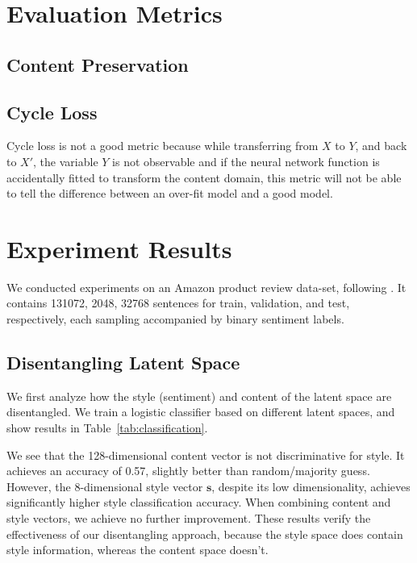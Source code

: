 \section{Evaluation Metrics}

\subsection{Content Preservation} \label{content-preservation-metric}

\subsection{Cycle Loss}

Cycle loss is not a good metric because while transferring from $X$ to $Y$, and back to $X'$, the variable $Y$ is not observable and if the neural network function is accidentally fitted to transform the content domain, this metric will not be able to tell the difference between an over-fit model and a good model.


\section{Experiment Results}

We conducted experiments on an Amazon product review data-set, following \cite{fu2017style}. It contains 131072, 2048, 32768 sentences for train, validation, and test, respectively, each sampling accompanied by binary sentiment labels.

\subsection{Disentangling Latent Space}

We first analyze how the style (sentiment) and content of the latent space are disentangled. We train a logistic classifier based on different latent spaces, and show results in Table~\ref{tab:classification}.

We see that the 128-dimensional content vector is not discriminative for style. It achieves an accuracy of 0.57, slightly better than random/majority guess. However, the 8-dimensional style vector $\bm s$, despite its low dimensionality, achieves significantly higher style classification accuracy. When combining content and style vectors, we achieve no further improvement. These results verify the effectiveness of our disentangling approach, because the style space does contain style information, whereas the content space doesn't.


